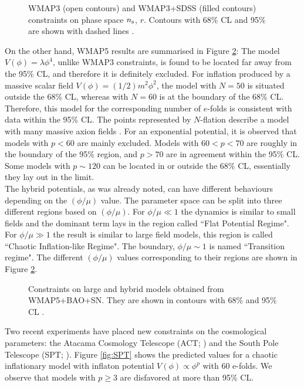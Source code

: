 \documentclass{rmaa}
\begin{document}
\begin{figure}[h!] 
\centerline{ \epsfxsize=220pt  }
\caption{WMAP3 (open contours) and 
WMAP3+SDSS (filled contours) constraints on phase space $n_{\rm s}$, $r$. Contours with 68\% CL 
and 95\% are shown with dashed lines \citep{Kinney}.}
\label{fig:Kinney2}
\end{figure}


On the other hand, WMAP5 results are summarised in Figure \ref{fig:Komatsu2}:
The model $V(\phi)=\lambda \phi^4$, unlike WMAP3 constraints, is found to be located 
far away from the 95\% CL, and therefore it is definitely excluded. For inflation produced by a massive 
scalar field $V(\phi)=(1/2)m^2\phi^2$, the model with $N=50$ is situated outside the 
68\% CL, whereas with $N=60$ is at the boundary of the 68\% CL. 
Therefore, this model for the corresponding number of $e$-folds is consistent with data within the 95\% CL. 
The points represented by $N$-flation describe a model with many massive axion fields \citep{Liddle3}. 
For an exponential potential, it is observed that models with $p<60$ are mainly excluded.
Models with $60<p<70$ are roughly in the boundary of the 95\% region, and $p>70$ are 
in agreement within the 95\% CL. 
Some models with $p\sim 120$ can be located in or outside the 68\% CL, essentially
they lay out in the limit. 
\\

The hybrid potentials, as was already noted, can have different behaviours
depending on the $(\phi/ \mu)$ value. The parameter space can be split into three 
different regions based on $(\phi / \mu)$. For $\phi / \mu \ll 1$ the dynamics is similar to small
fields and the dominant term lays in the region called ``Flat Potential Regime". 
For $\phi / \mu \gg 1$ the result is similar to large field models, this region is called
``Chaotic Inflation-like Regime". The boundary, $\phi / \mu \sim 1$ is named 
``Transition regime". The different $(\phi / \mu)$ values corresponding to their regions
are shown in Figure \ref{fig:Komatsu2}.
  


\begin{figure}[h!]
\centerline{ \epsfxsize=190pt  }
\caption{Constraints on large and hybrid models obtained from WMAP5+BAO+SN.
They are shown in contours with 68\% and 95\% CL
 \citep{Komatsu}.}
 \label{fig:Komatsu2}
\end{figure}

Two recent experiments have placed new constraints on the cosmological parameters: the Atacama
Cosmology Telescope (ACT; \citet{ACT}) and the South Pole Telescope (SPT; \citet{SPT}).
Figure \ref{fig:SPT} shows the predicted values for a chaotic inflationary model with inflaton
potential $V(\phi)\propto\phi^p$ with 60 e-folds. We observe that models with $p\ge3$
are disfavored at more than 95\% CL.
\end{document}
